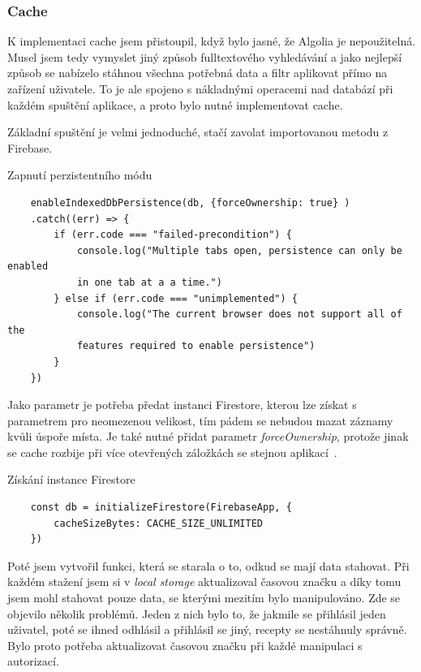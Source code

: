 \subsubsection{Cache}
K implementaci cache jsem přistoupil, když bylo jasné, že Algolia je nepoužitelná. Musel jsem tedy vymyslet jiný způsob fulltextového
vyhledávání a jako nejlepší způsob se nabízelo stáhnou všechna potřebná data a filtr aplikovat přímo na zařízení uživatele. To je ale
spojeno s nákladnými operacemi nad databází při každém spuštění aplikace, a proto bylo nutné implementovat cache.

Základní spuštění je velmi jednoduché, stačí zavolat importovanou metodu z Firebase.

\begin{listing}[h]
    \caption{Zapnutí perzistentního módu}
    \begin{verbatim}
    enableIndexedDbPersistence(db, {forceOwnership: true} )
    .catch((err) => {
        if (err.code === "failed-precondition") {
            console.log("Multiple tabs open, persistence can only be enabled
            in one tab at a a time.")
        } else if (err.code === "unimplemented") {
            console.log("The current browser does not support all of the
            features required to enable persistence")
        }
    })
    \end{verbatim}
\end{listing}

Jako parametr je potřeba předat instanci Firestore, kterou lze získat s parametrem pro neomezenou velikost, tím pádem se nebudou
mazat záznamy kvůli úspoře místa. Je také nutné přidat parametr \emph{forceOwnership}, protože jinak se cache rozbije při více
otevřených záložkách se stejnou aplikací~\cite{FirebaseMultipleTabs}.

\begin{listing}[h]
    \caption{Získání instance Firestore}
    \begin{verbatim}
    const db = initializeFirestore(FirebaseApp, {
        cacheSizeBytes: CACHE_SIZE_UNLIMITED
    })
    \end{verbatim}
\end{listing}

Poté jsem vytvořil funkci, která se starala o to, odkud se mají data stahovat. Při každém stažení jsem si v \emph{local storage} aktualizoval
časovou značku a díky tomu jsem mohl stahovat pouze data, se kterými mezitím bylo manipulováno. Zde se objevilo několik problémů. Jeden z nich
bylo to, že jakmile se přihlásil jeden uživatel, poté se ihned odhlásil a přihlásil se jiný, recepty se nestáhnuly správně. Bylo proto potřeba
aktualizovat časovou značku při každé manipulaci s autorizací.

